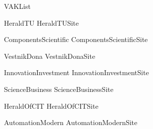 \renewcommand\ExhibitGroup{Articles}

{VAKList}

{HeraldTU}
{HeraldTUSite}

{ComponentsScientific}
{ComponentsScientificSite}

{VestnikDona}
{VestnikDonaSite}

{InnovationInvestment}
{InnovationInvestmentSite}

{ScienceBusiness}
{ScienceBusinessSite}

{HeraldOfCIT}
{HeraldOfCITSite}

{AutomationModern}
{AutomationModernSite}

